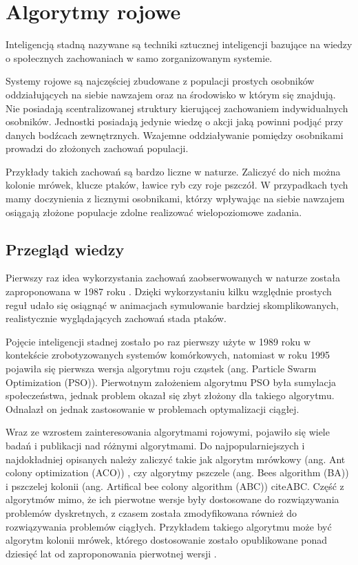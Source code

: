 \chapter{Algorytmy rojowe}
\label{cha:pso}
Inteligencją stadną nazywane są techniki sztucznej inteligencji bazujące na wiedzy o społecznych zachowaniach w samo zorganizowanym systemie. 

Systemy rojowe są najczęściej zbudowane z populacji prostych osobników oddziałujących na siebie nawzajem oraz na środowisko w którym się znajdują. Nie posiadają scentralizowanej struktury kierującej zachowaniem indywidualnych osobników. Jednostki posiadają jedynie wiedzę o akcji jaką powinni podjąć przy danych bodźcach zewnętrznych. Wzajemne oddziaływanie pomiędzy osobnikami prowadzi do złożonych zachowań populacji.

Przykłady takich zachowań są bardzo liczne w naturze. Zaliczyć do nich można kolonie mrówek, klucze ptaków, ławice ryb czy roje pszczół. W przypadkach tych mamy doczynienia z licznymi osobnikami, którzy wpływając na siebie nawzajem osiągają złożone populacje zdolne realizować wielopoziomowe zadania.


\section{Przegląd wiedzy}
\label{sec:historiarojowych}
Pierwszy raz idea wykorzystania zachowań zaobserwowanych w naturze została zaproponowana w 1987 roku \cite{Reynolds87}. Dzięki wykorzystaniu kilku względnie prostych reguł udało się osiągnąć w animacjach symulowanie bardziej skomplikowanych, realistycznie wyglądających zachowań stada ptaków. 

Pojęcie inteligencji stadnej zostało po raz pierwszy użyte w 1989 roku\cite{BeniWang89} w kontekście zrobotyzowanych systemów komórkowych, natomiast w roku 1995 \cite{KennedyEberhart95} pojawiła się pierwsza wersja algorytmu roju cząstek (ang. Particle Swarm Optimization (PSO)). Pierwotnym założeniem algorytmu PSO była sumylacja społeczeństwa, jednak problem okazał się zbyt złożony dla takiego algorytmu. Odnalazł on jednak zastosowanie w problemach optymalizacji ciągłej.

Wraz ze wzrostem zainteresowania algorytmami rojowymi, pojawiło się wiele badań i publikacji nad różnymi algorytmami. Do najpopularniejszych i najdokładniej opisanych należy zaliczyć takie jak algorytm mrówkowy (ang. Ant colony optimization (ACO)) \cite{ACO}, czy algorytmy pszczele (ang. Bees algorithm (BA)) \cite{BA} i pszczelej kolonii (ang. Artifical bee colony algorithm (ABC)) cite{ABC}. Część z algorytmów mimo, że ich pierwotne wersje były dostosowane do rozwiązywania problemów dyskretnych, z czasem została zmodyfikowana również do rozwiązywania problemów ciągłych. Przykładem takiego algorytmu może być algorytm kolonii mrówek, którego dostosowanie zostało opublikowane ponad dziesięć lat od zaproponowania pierwotnej wersji \cite{ACO2}. 

